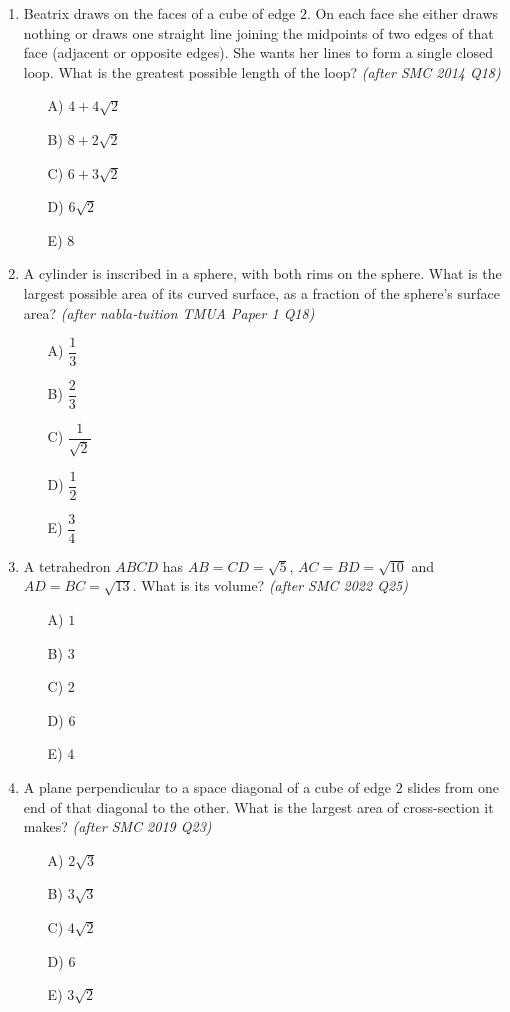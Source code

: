 \documentclass[11pt,a4paper]{article}
\begin{document}
\begin{enumerate}

\item Beatrix draws on the faces of a cube of edge $2$. On each face she either draws nothing or draws one straight line joining the midpoints of two edges of that face (adjacent or opposite edges). She wants her lines to form a single closed loop. What is the greatest possible length of the loop? \textit{\small(after SMC 2014 Q18)}
\begin{itemize}
\item[A)] $4+4\sqrt2$
\item[B)] $8+2\sqrt2$
\item[C)] $6+3\sqrt2$
\item[D)] $6\sqrt2$
\item[E)] $8$
\end{itemize}

\item A cylinder is inscribed in a sphere, with both rims on the sphere. What is the largest possible area of its curved surface, as a fraction of the sphere's surface area? \textit{\small(after nabla-tuition TMUA Paper 1 Q18)}
\begin{itemize}[itemsep=3pt]
\item[A)] $\dfrac13$
\item[B)] $\dfrac23$
\item[C)] $\dfrac{1}{\sqrt2}$
\item[D)] $\dfrac12$
\item[E)] $\dfrac34$
\end{itemize}

\item A tetrahedron $ABCD$ has $AB=CD=\sqrt5$, $AC=BD=\sqrt{10}$ and $AD=BC=\sqrt{13}$. What is its volume? \textit{\small(after SMC 2022 Q25)}
\begin{itemize}
\item[A)] $1$
\item[B)] $3$
\item[C)] $2$
\item[D)] $6$
\item[E)] $4$
\end{itemize}

\item A plane perpendicular to a space diagonal of a cube of edge $2$ slides from one end of that diagonal to the other. What is the largest area of cross-section it makes? \textit{\small(after SMC 2019 Q23)}
\begin{itemize}
\item[A)] $2\sqrt3$
\item[B)] $3\sqrt3$
\item[C)] $4\sqrt2$
\item[D)] $6$
\item[E)] $3\sqrt2$
\end{itemize}


\end{enumerate}
\end{document}
